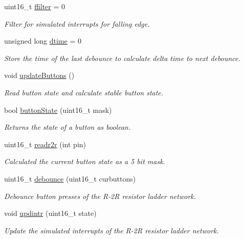 \begin{DoxyCompactItemize}
uint16\+\_\+t \hyperlink{group__buttons_gaaa75cede053f94cf46d7420556af1505}{ffilter} = 0
\begin{DoxyCompactList}\small\item\em Filter for simulated interrupts for falling edge. \end{DoxyCompactList}\item 
unsigned long \hyperlink{group__buttons_ga94921f7ca95d518d3deabb1da432c2fb}{dtime} = 0
\begin{DoxyCompactList}\small\item\em Store the time of the last debounce to calculate delta time to next debounce. \end{DoxyCompactList}\item 
void \hyperlink{group__buttons_gaf32fa88edc93b34e25f058e331ea1134}{update\+Buttons} ()
\begin{DoxyCompactList}\small\item\em Read button state and calculate stable button state. \end{DoxyCompactList}\item 
bool \hyperlink{group__buttons_gad4a8f6035320735a6ed69364c0f29d63}{button\+State} (uint16\+\_\+t mask)
\begin{DoxyCompactList}\small\item\em Returns the state of a button as boolean. \end{DoxyCompactList}\item 
uint16\+\_\+t \hyperlink{group__buttons_ga5421761bb5d1c3470d3b17196a438c80}{readr2r} (int pin)
\begin{DoxyCompactList}\small\item\em Calculated the current button state as a 5 bit mask. \end{DoxyCompactList}\item 
uint16\+\_\+t \hyperlink{group__buttons_ga0ce7c5a698df341a0f3882378518f562}{debounce} (uint16\+\_\+t curbuttons)
\begin{DoxyCompactList}\small\item\em Debounce button presses of the R-\/2R resistor ladder network. \end{DoxyCompactList}\item 
void \hyperlink{group__buttons_ga66c6a02c014dc9acd3af0c816a70fad8}{updintr} (uint16\+\_\+t state)
\begin{DoxyCompactList}\small\item\em Update the simulated interrupts of the R-\/2R resistor ladder network. \end{DoxyCompactList}\item 

\end{DoxyCompactItemize}
